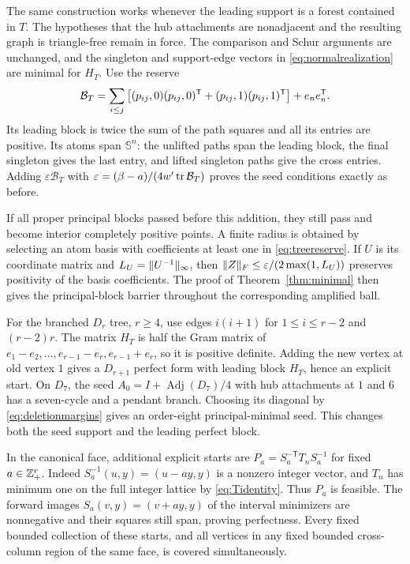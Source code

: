 The same construction works whenever the leading support is a forest contained in $T$. The hypotheses that the hub attachments are nonadjacent and the resulting graph is triangle-free remain in force. The comparison and Schur arguments are unchanged, and the singleton and support-edge vectors in \eqref{eq:normalrealization} are minimal for $H_T$. Use the reserve
\begin{equation}\label{eq:treereserve}
 \mathcal B_T=\sum_{i\le j}\left[
 (p_{ij},0)(p_{ij},0)^{\mathsf T}+(p_{ij},1)(p_{ij},1)^{\mathsf T}\right]+e_ne_n^{\mathsf T}.
\end{equation}
Its leading block is twice the sum of the path squares and all its entries are positive. Its atoms span $\mathbb S^n$: the unlifted paths span the leading block, the final singleton gives the last entry, and lifted singleton paths give the cross entries. Adding $\varepsilon\mathcal B_T$ with $\varepsilon=(\beta-a)/(4w'\operatorname{tr}\mathcal B_T)$ proves the seed conditions exactly as before.

If all proper principal blocks passed before this addition, they still pass and become interior completely positive points. A finite radius is obtained by selecting an atom basis with coefficients at least one in \eqref{eq:treereserve}. If $U$ is its coordinate matrix and $L_U=\lVert U^{-1}\rVert_\infty$, then
$\lVert Z\rVert_F\le\varepsilon/(2\max(1,L_U))$ preserves positivity of the basis coefficients. The proof of Theorem~\ref{thm:minimal} then gives the principal-block barrier throughout the corresponding amplified ball.

For the branched $D_r$ tree, $r\ge4$, use edges $i(i+1)$ for $1\le i\le r-2$ and $(r-2)r$. The matrix $H_T$ is half the Gram matrix of
$e_1-e_2,\ldots,e_{r-1}-e_r,e_{r-1}+e_r$, so it is positive definite. Adding the new vertex at old vertex $1$ gives a $D_{r+1}$ perfect form with leading block $H_T$, hence an explicit start. On $D_7$, the seed $A_0=I+\operatorname{Adj}(D_7)/4$ with hub attachments at $1$ and $6$ has a seven-cycle and a pendant branch. Choosing its diagonal by \eqref{eq:deletionmargins} gives an order-eight principal-minimal seed. This changes both the seed support and the leading perfect block.

In the canonical face, additional explicit starts are
$P_a=S_a^{-\mathsf T}T_nS_a^{-1}$ for fixed $a\in\mathbb Z_+^r$. Indeed $S_a^{-1}(u,y)=(u-ay,y)$ is a nonzero integer vector, and $T_n$ has minimum one on the full integer lattice by \eqref{eq:Tidentity}. Thus $P_a$ is feasible. The forward images $S_a(v,y)=(v+ay,y)$ of the interval minimizers are nonnegative and their squares still span, proving perfectness. Every fixed bounded collection of these starts, and all vertices in any fixed bounded cross-column region of the same face, is covered simultaneously.

